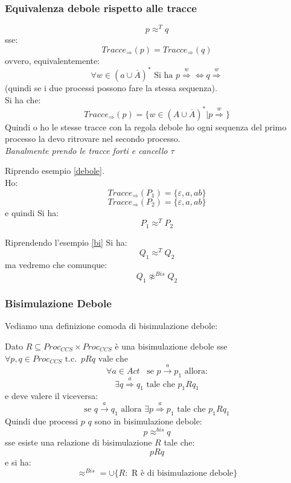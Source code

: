 \subsubsection{Equivalenza debole rispetto alle tracce}
\begin{definizione}
  \[p\approx^T q\]
  sse:
  \[Tracce_{\Rightarrow}(p)=Tracce_{\Rightarrow}(q)\]
  ovvero, equivalentemente:
  \[\forall w\in(a\cup \overline{A})^*\mbox{ Si ha }p\stackrel{w}{\Rightarrow}
    \iff q\stackrel{w}{\Rightarrow}\]
  (quindi se i due processi possono fare la stessa sequenza).\\
  Si ha che:
  \[Tracce_{\Rightarrow}(p)=\{w\in(A\cup \overline{A})^*|
    p\stackrel{w}{\Rightarrow}\}\]
  Quindi o ho le stesse tracce con la regola debole ho ogni sequenza del primo
  processo la devo ritrovare nel secondo processo.\\
  \textit{Banalmente prendo le tracce forti e cancello $\tau$}
\end{definizione}
\begin{esempio}
  Riprendo esempio \ref{debole}.\\
  Ho:
  \[Tracce_{\Rightarrow}(P_1)=\{\varepsilon, a, ab\}\]
  \[Tracce_{\Rightarrow}(P_2)=\{\varepsilon, a, ab\}\]
  e quindi Si ha:
  \[P_1\approx^T P_2\]
\end{esempio}
\begin{esempio}
  Riprendendo l'esempio \ref{bi} Si ha:
  \[Q_1\approx^T Q_2\]
  ma vedremo che comunque:
  \[Q_1\not\approx^{Bis} Q_2\]
\end{esempio}
\subsubsection{Bisimulazione Debole}
Vediamo una definizione comoda di bisimulazione debole:
\begin{definizione}
  Dato $R\subseteq Proc_{CCS}\times Proc_{CCS}$ è una bisimulazione debole sse $\forall p, q\in Proc_{CCS}\mbox{ t.c. }\, pRq \mbox{ vale che }$ 
  \[\forall a\in
    Act\,\,\,\,\,\mbox{se }p\stackrel{a}{\rightarrow}p_1\mbox{ allora:} \] \[\exists
    q\stackrel{a}{\Rightarrow}q_1 \mbox{ tale che } p_1Rq_1\]
  e deve valere il viceversa:
  \[\mbox{se }q\stackrel{a}{\rightarrow}q_1\mbox{ allora }\exists
    p\stackrel{a}{\Rightarrow}p_1 \mbox{ tale che } p_1Rq_1\]
  Quindi due processi $p$ $q$ sono in bisimulazione debole:
  \[p\approx^{bis} q\] sse esiste una relazione di bisimulazione $R$ tale che:
  \[pRq\]
  e si ha:
  \[\approx^{Bis}=\cup\{R:\mbox{ R è di bisimulazione debole}\}\]
\end{definizione}
